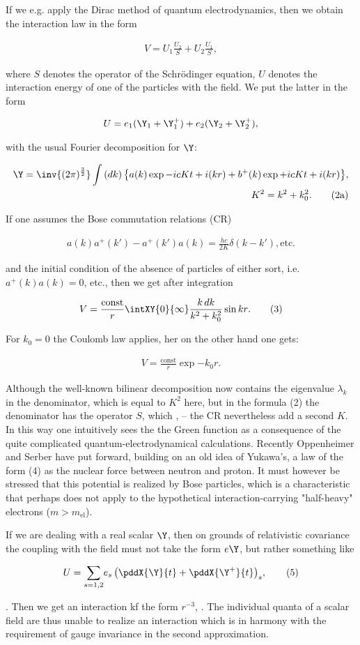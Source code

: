 \documentclass{article}
\newcommand{\nequ}[2]{
\begin{align*}
#1
\tag{#2}
\end{align*}
}
\newcommand{\uequ}[1]{
\begin{align*}
#1
\end{align*}
}
\newcommand{\sumX}[1]{\underset{#1}{\sum}}
\begin{document}
If we e.g. apply the Dirac method of quantum electrodynamics, then we obtain the interaction law in the form
\nequ{
V = U_1\frac{U_2}{S} + U_2\frac{U_1}{S},
}{2}
where $S$ denotes the operator of the Schr\"odinger equation, $U$ denotes the interaction energy of one of the particles with the field. We put the latter in the form
\uequ{
U = e_1(\Y_1 + \Y_1^+) + e_2(\Y_2 + \Y_2^+),
}
with the usual Fourier decomposition for $\Y$:
\nequ{
\Y = \inv{(2\pi)^{\frac{3}{2}}}
\int{({dk})\left\{a(k)\exp{-icKt + i(kr)} + b^+(k)\exp{+icKt + i(kr)}\right\}},\\
K^2 = k^2 + k_0^2.
}{2a}

If one assumes the Bose commutation relations (CR)
\nequ{
a(k)a^+(k') - a^+(k')a(k) = \frac{hc}{2K}\delta(k-k'), \text{etc.}
}{2b}
and the initial condition of the absence of particles of either sort, i.e. $a^+(k)a(k)=0$, etc., then we get after integration
\nequ{
V = \frac{\text{const}}{r}\intXY{0}{\infty}\frac{k\,{dk}}{k^2+k_0^2}\sin{kr}.
}{3}
For $k_0 = 0$ the Coulomb law applies, her on the other hand one gets:
\nequ{
V=\frac{\text{const}}{r}\exp{-k_0 r}.
}{4}
Although the well-known bilinear decomposition now contains the eigenvalue $\lambda_k$ in the denominator, which is equal to $K^2$ here, but in the formula (2) the denominator has the operator $S$, which , -- the CR nevertheless add a second $K$. In this way one intuitively sees the  the Green function as a consequence of the quite complicated quantum-electrodynamical calculations. Recently Oppenheimer and Serber have put forward, building on an old idea of Yukawa's, a law of the form (4) as the nuclear force between neutron and proton. It must however be stressed that this potential is realized by Bose particles, which is a characteristic that perhaps does not apply to the hypothetical interaction-carrying "half-heavy" electrons ($m>m_\text{el}$).

If we are dealing with a real scalar $\Y$, then on grounds of relativistic covariance the coupling with the field must not take the form $e\Y$, but rather something like
\nequ{
U = \sumX{s=1,2}{e_s\left(\pddX{\Y}{t} + \pddX{\Y^+}{t}\right)_s},
}{5}
. Then we get an interaction kf the form $r^{-3}$, . The individual quanta of a scalar field are thus unable to realize an interaction which is in harmony with the requirement of gauge invariance in the second approximation.
\end{document}
